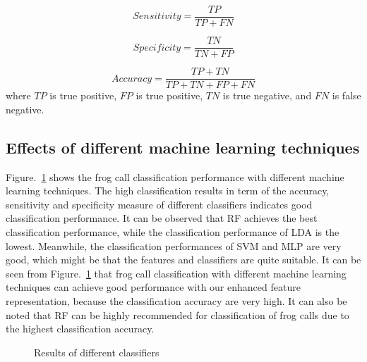 \begin{equation}
Sensitivity = \frac{TP}{TP+FN}
\end{equation}

\begin{equation}
Specificity = \frac{TN}{TN+FP}
\end{equation}

\begin{equation}
Accuracy = \frac{TP+TN}{TP+TN+FP+FN}
\end{equation}
where $TP$ is true positive, $FP$ is true positive, $TN$ is true negative, and $FN$ is false negative.

\subsection{Effects of different machine learning techniques}
Figure.~\ref{diffClassifier} shows the frog call classification performance with different machine learning techniques. The high classification results in term of the accuracy, sensitivity and specificity measure of different classifiers indicates good classification performance. It can be observed that RF achieves the best classification performance, while the classification performance of LDA is the lowest. Meanwhile, the classification performances of SVM and MLP are very good, which might be that the features and classifiers are quite suitable. It can be seen from Figure.~\ref{diffClassifier} that frog call classification with different machine learning techniques can achieve good performance with our enhanced feature representation, because the classification accuracy are very high. It can also be noted that RF can be highly recommended for classification of frog calls due to the highest classification accuracy.



\begin{figure}[htb!] %
\caption{Results of different classifiers}
\label{diffClassifier} 
\end{figure}

